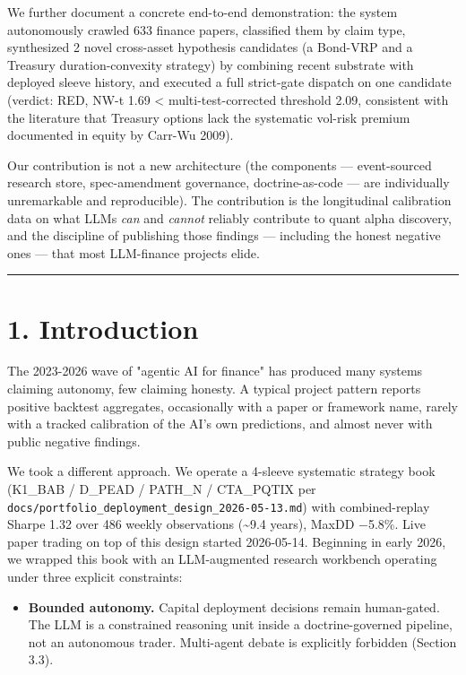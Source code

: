 \documentclass[11pt,a4paper]{article}
\begin{document}
We further document a concrete end-to-end demonstration: the system autonomously crawled 633 finance papers, classified them by claim type, synthesized 2 novel cross-asset hypothesis candidates (a Bond-VRP and a Treasury duration-convexity strategy) by combining recent substrate with deployed sleeve history, and executed a full strict-gate dispatch on one candidate (verdict: RED, NW-t 1.69 < multi-test-corrected threshold 2.09, consistent with the literature that Treasury options lack the systematic vol-risk premium documented in equity by Carr-Wu 2009).

Our contribution is not a new architecture (the components — event-sourced research store, spec-amendment governance, doctrine-as-code — are individually unremarkable and reproducible). The contribution is the longitudinal calibration data on what LLMs \textit{can} and \textit{cannot} reliably contribute to quant alpha discovery, and the discipline of publishing those findings — including the honest negative ones — that most LLM-finance projects elide.

\medskip\hrule\medskip

\section{1. Introduction}

The 2023-2026 wave of "agentic AI for finance" has produced many systems claiming autonomy, few claiming honesty. A typical project pattern reports positive backtest aggregates, occasionally with a paper or framework name, rarely with a tracked calibration of the AI's own predictions, and almost never with public negative findings.

We took a different approach. We operate a 4-sleeve systematic strategy book (K1\_BAB / D\_PEAD / PATH\_N / CTA\_PQTIX per \texttt{docs/portfolio\_deployment\_design\_2026-05-13.md}) with combined-replay Sharpe 1.32 over 486 weekly observations (\textasciitilde{}9.4 years), MaxDD −5.8\%. Live paper trading on top of this design started 2026-05-14. Beginning in early 2026, we wrapped this book with an LLM-augmented research workbench operating under three explicit constraints:

\begin{itemize}[leftmargin=*]
\item \textbf{Bounded autonomy.} Capital deployment decisions remain human-gated. The LLM is a constrained reasoning unit inside a doctrine-governed pipeline, not an autonomous trader. Multi-agent debate is explicitly forbidden (Section 3.3).
\end{itemize}
\end{document}

